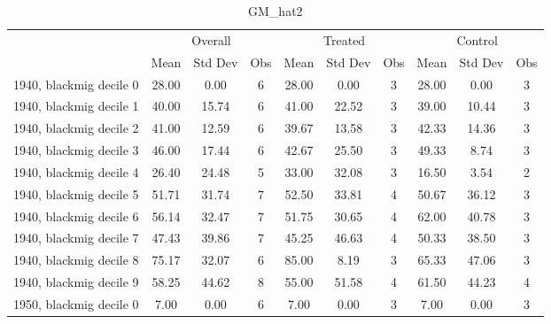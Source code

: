 \begin{table}[htbp]\centering
\def\sym#1{\ifmmode^{#1}\else\(^{#1}\)\fi}
\caption{GM\_hat2 \label{tab1}}
\begin{tabular}{l*{3}{ccc}}
\toprule
                    &\multicolumn{3}{c}{Overall}           &\multicolumn{3}{c}{Treated}           &\multicolumn{3}{c}{Control}           \\
                    &        Mean&     Std Dev&         Obs&        Mean&     Std Dev&         Obs&        Mean&     Std Dev&         Obs\\
\midrule
1940, blackmig decile 0&       28.00&        0.00&           6&       28.00&        0.00&           3&       28.00&        0.00&           3\\
1940, blackmig decile 1&       40.00&       15.74&           6&       41.00&       22.52&           3&       39.00&       10.44&           3\\
1940, blackmig decile 2&       41.00&       12.59&           6&       39.67&       13.58&           3&       42.33&       14.36&           3\\
1940, blackmig decile 3&       46.00&       17.44&           6&       42.67&       25.50&           3&       49.33&        8.74&           3\\
1940, blackmig decile 4&       26.40&       24.48&           5&       33.00&       32.08&           3&       16.50&        3.54&           2\\
1940, blackmig decile 5&       51.71&       31.74&           7&       52.50&       33.81&           4&       50.67&       36.12&           3\\
1940, blackmig decile 6&       56.14&       32.47&           7&       51.75&       30.65&           4&       62.00&       40.78&           3\\
1940, blackmig decile 7&       47.43&       39.86&           7&       45.25&       46.63&           4&       50.33&       38.50&           3\\
1940, blackmig decile 8&       75.17&       32.07&           6&       85.00&        8.19&           3&       65.33&       47.06&           3\\
1940, blackmig decile 9&       58.25&       44.62&           8&       55.00&       51.58&           4&       61.50&       44.23&           4\\
1950, blackmig decile 0&        7.00&        0.00&           6&        7.00&        0.00&           3&        7.00&        0.00&           3\\

\end{tabular}
\end{table}
